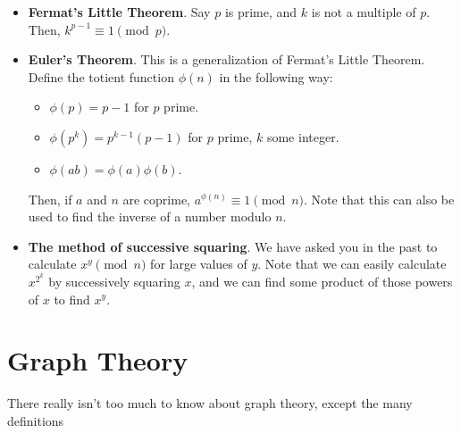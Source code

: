 \documentclass[11pt]{article}
\begin{document}
	\begin{itemize}
		\item \textbf{Fermat's Little Theorem}.  Say $p$ is prime, and $k$ is not a multiple of $p$.  Then, $k^{p-1} \equiv 1 \pmod{p}$.
		
		\item  \textbf{Euler's Theorem}.  This is a generalization of Fermat's Little Theorem.  Define the totient function $\phi(n)$ in the following way:
		
		\begin{itemize}
			\item $\phi(p) = p-1$ for $p$ prime.
			\item $\phi(p^k) = p^{k-1}(p-1)$ for $p$ prime, $k$ some integer.
			\item $\phi(ab) = \phi(a)\phi(b)$.
		\end{itemize} 
		
		Then, if $a$ and $n$ are coprime, $a^{\phi(n)} \equiv 1 \pmod{n}$.  Note that this can also be used to find the inverse of a number modulo $n$.
		
		\item \textbf{The method of successive squaring}.  We have asked you in the past to 
		calculate $x^y \pmod n$ for large values of $y$.  Note that we can easily calculate
		$x^{2^k}$ by successively squaring $x$, and we can find some product of those
		powers of $x$ to find $x^y$.  
	\end{itemize}	

\section{Graph Theory}
There really isn't too much to know about graph theory, except the many definitions
\end{document}
